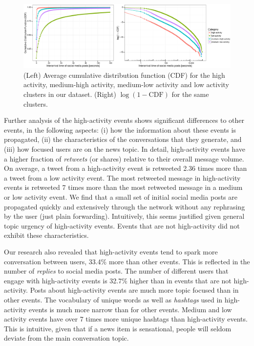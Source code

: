 \begin{figure}
  \centering
  \includegraphics[width=\textwidth]{figures/high-activity/fig6_log}
  \caption{{(Left) Average cumulative distribution function (CDF) for the high
activity, medium-high activity, medium-low activity and low activity clusters in
our dataset. (Right) $\log{(1 - \mathrm{CDF})}$ for the same clusters. 
    }}\label{fig:hi:cdf} %
\end{figure}



Further analysis of the high-activity events shows significant differences to
other events, in the following aspects: 
%
(i) how the information about these events is propagated, 
%
(ii) the characteristics of the conversations that they generate, and 
%
(iii) how focused users are on the news topic. 
%
In detail, high-activity events have a higher fraction of {\em retweets} (or
shares) relative to their overall message volume. 
%
On average, a tweet from a high-activity event is retweeted 2.36 times more than
a tweet from a low activity event. 
%
The most retweeted message in high-activity events is retweeted 7 times more
than the most retweeted message in a medium or low activity event. 
%
We find that a small set of initial social media posts are propagated quickly
and extensively through the network without any rephrasing by the user (just
plain forwarding). 
%
Intuitively, this seems justified given general topic urgency of high-activity
events. 
%
Events that are not high-activity did not exhibit these characteristics.


Our research also revealed that high-activity events tend to spark more
conversation between users, 33.4\% more than other events. 
%
This is reflected in the number of {\em replies} to social media posts. 
%
The number of different users that engage with high-activity events is 32.7\%
higher than in events that are not high-activity. 
%
Posts about high-activity events are much more topic focused than in other
events. 
%
The vocabulary of unique words as well as {\em hashtags} used in high-activity
events is much more narrow than for other events. 
%
Medium and low activity events have over 7 times more unique hashtags than
high-activity events. 
%
This is intuitive, given that if a news item is sensational, people will seldom
deviate from the main conversation topic.

